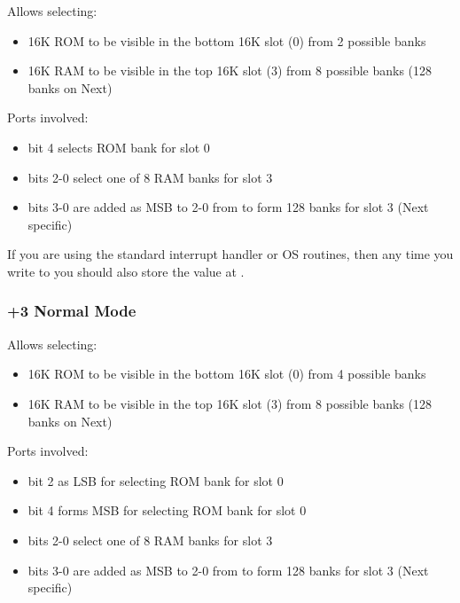 Allows selecting:

\begin{itemize}[topsep=0pt,itemsep=0pt]
	\item 16K ROM to be visible in the bottom 16K slot (0) from 2 possible banks
	\item 16K RAM to be visible in the top 16K slot (3) from 8 possible banks (128 banks on Next)
\end{itemize}

Ports involved:

\begin{itemize}[topsep=0pt,itemsep=0pt]
	\item {} bit 4 selects ROM bank for slot 0
	\item {} bits 2-0 select one of 8 RAM banks for slot 3
	\item {} bits 3-0 are added as MSB to 2-0 from  to form 128 banks for slot 3 (Next specific)
\end{itemize}

If you are using the standard interrupt handler or OS routines, then any time you write to  you should also store the value at .


\subsubsection{+3 Normal Mode}

\begin{PagingTableLegacy}
	\PagingTableLegacyItem{}{$\uparrow$}{}{}{$\uparrow$}
\end{PagingTableLegacy}

Allows selecting:

\begin{itemize}[topsep=0pt,itemsep=0pt]
	\item 16K ROM to be visible in the bottom 16K slot (0) from 4 possible banks
	\item 16K RAM to be visible in the top 16K slot (3) from 8 possible banks (128 banks on Next)
\end{itemize}

Ports involved:

\begin{itemize}[topsep=0pt,itemsep=0pt]
	\item {} bit 2 as LSB for selecting ROM bank for slot 0
	\item {} bit 4 forms MSB for selecting ROM bank for slot 0
	\item {} bits 2-0 select one of 8 RAM banks for slot 3
	\item {} bits 3-0 are added as MSB to 2-0 from  to form 128 banks for slot 3 (Next specific)
\end{itemize}

